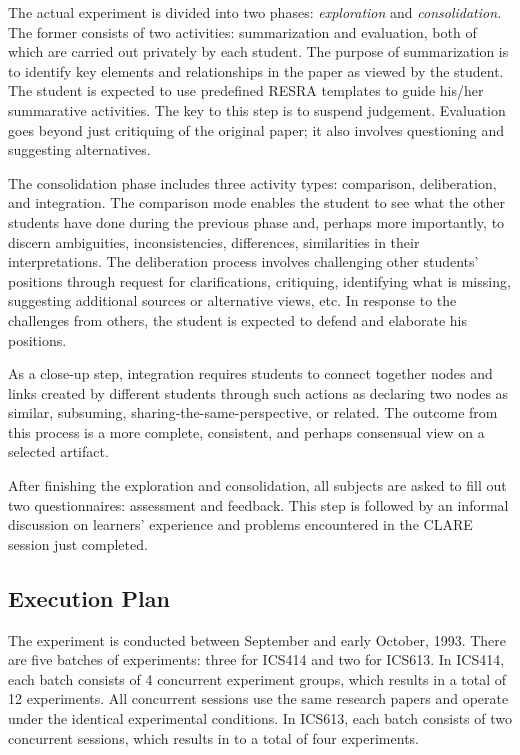 The actual experiment is divided into two phases: {\it exploration\/} and
{\it consolidation.\/}  The former consists of two activities: summarization
and evaluation, both of which are carried out privately by each student.
The purpose of summarization is to identify key elements and relationships
in the paper as viewed by the student. The student is expected to use
predefined RESRA templates to guide his/her summarative activities. The key
to this step is to suspend judgement. Evaluation goes beyond just
critiquing of the original paper; it also involves questioning and
suggesting alternatives.

The consolidation phase includes three activity types: comparison,
deliberation, and integration. The comparison mode enables the student to
see what the other students have done during the previous phase and,
perhaps more importantly, to discern ambiguities, inconsistencies,
differences, similarities in their interpretations. The deliberation
process involves challenging other students' positions through request for
clarifications, critiquing, identifying what is missing, suggesting
additional sources or alternative views, etc.  In response to the
challenges from others, the student is expected to defend and elaborate his
positions.

As a close-up step, integration requires students to connect together nodes
and links created by different students through such actions as declaring
two nodes as similar, subsuming, sharing-the-same-perspective, or related.
The outcome from this process is a more complete, consistent, and perhaps
consensual view on a selected artifact.

After finishing the exploration and consolidation, all subjects are asked
to fill out two questionnaires: assessment and feedback.  This step is
followed by an informal discussion on learners' experience and problems
encountered in the CLARE session just completed.

\subsection{Execution Plan}
\label{sec:exec-plan}

The experiment is conducted between September and early October, 1993.
There are five batches of experiments: three for ICS414 and two for ICS613.
In ICS414, each batch consists of 4 concurrent experiment groups, which
results in a total of 12 experiments. All concurrent sessions use the same
research papers and operate under the identical experimental conditions. In
ICS613, each batch consists of two concurrent sessions, which results in to
a total of four experiments.

